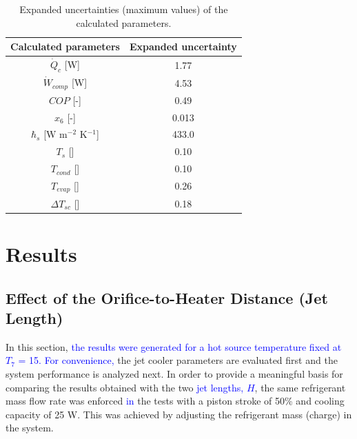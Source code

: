 \documentclass[review,preprint,12pt]{elsarticle}
\begin{document}
\begin{table}[!htbp]
	\caption{Expanded uncertainties (maximum values) of the calculated parameters.}   
	\label{tab:Table_1}
	\centering
	\normalsize
	\begin{tabular}{@{} cc @{}}
		\toprule
 		Calculated parameters & Expanded uncertainty\\\hline
		$\dot{Q}_{c}$ [W] & 1.77 \\
		$\dot{W}_{comp}$ [W] & 4.53\\
		$COP$ [-] & 0.49\\
		$x_{6}$ [-] & 0.013\\
		$\hbar_{s}$ [W m$^{-2}$ K$^{-1}$] & 433.0\\
		$T_{s}$ [\textcelsius] & 0.10\\
		$T_{cond}$ [\textcelsius] & 0.10\\
		$T_{evap}$ [\textcelsius] & 0.26\\
		$\Delta T_{sc}$ [\textcelsius] & 0.18\\\bottomrule
	\end{tabular}
\end{table}

%

\section{Results}

\subsection{Effect of the Orifice-to-Heater Distance (Jet Length)}

In this section, \textcolor{blue}{the results were generated for a hot source temperature fixed at $T_{7}$ = 15\textcelsius. For convenience,} the jet cooler parameters are evaluated first and the system performance is analyzed next. In order to provide a meaningful basis for comparing the results obtained with the two  \textcolor{blue}{jet lengths, $H$}, the same refrigerant mass flow rate was enforced \textcolor{blue}{in} the tests with a piston stroke of 50\% and cooling capacity of 25 W. This was achieved by adjusting the refrigerant mass (charge) in the system.
\end{document}
